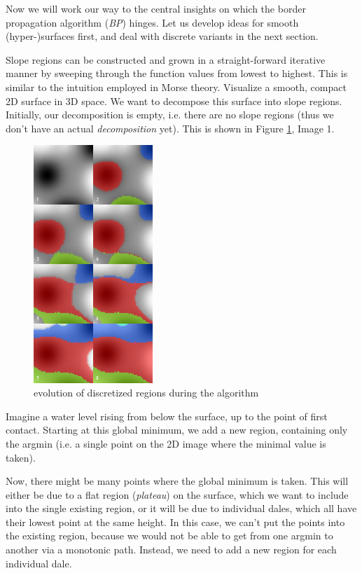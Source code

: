\documentclass[a4paper,12pt,notitlepage,fullpage]{paper}
\theoremstyle{plain}
\theoremstyle{definition}
\begin{document}
Now we will work our way to the central insights on which the border propagation algorithm (\emph{BP}) hinges.
Let us develop ideas for smooth (hyper-)surfaces first, and deal with discrete variants in the next section.

Slope regions can be constructed and grown in a straight-forward iterative manner by sweeping through the function values from lowest to highest. 
This is similar to the intuition employed in Morse theory\cite{MatsumotoYukio2002AitM}.
Visualize a smooth, compact 2D surface in 3D space.
We want to decompose this surface into slope regions.
Initially, our decomposition is empty, i.e. there are no slope regions (thus we don't have an actual \emph{decomposition} yet).
This is shown in Figure \ref{fig:evolution}, Image 1.

\begin{figure}
\centering
\includegraphics[width=0.4\textwidth]{img/slope_evolution.png}
\caption{evolution of discretized regions during the algorithm}
\label{fig:evolution}
\end{figure}

Imagine a water level rising from below the surface, up to the point of first contact.
Starting at this global minimum, we add a new region, containing only the argmin (i.e. a single point on the 2D image where the minimal value is taken).

Now, there might be many points where the global minimum is taken.
This will either be due to a flat region (\emph{plateau}) on the surface, which we want to include into the single existing region, or it will be due to individual dales, which all have their lowest point at the same height.
In this case, we can't put the points into the existing region, because we would not be able to get from one argmin to another via a monotonic path.
Instead, we need to add a new region for each individual dale.
\end{document}

